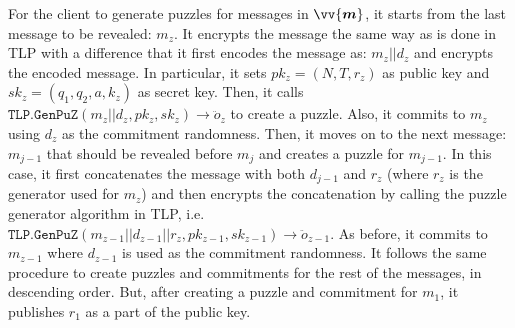 For the client to generate puzzles for messages in $\vv{\bm{m}}$, it starts from the last message to be revealed: $m_{\scriptscriptstyle z}$. It encrypts the message the same way as is done in  TLP with a difference that it first encodes the message as: $m_{\scriptscriptstyle z}||d_{\scriptscriptstyle z}$ and encrypts the encoded message. In particular, it sets $pk_{\scriptscriptstyle z}=(N,T,r_{\scriptscriptstyle z})$ as public key  and $sk_{\scriptscriptstyle z}=(q_{\scriptscriptstyle 1},q_{\scriptscriptstyle 2},a,k_{\scriptscriptstyle z})$ as secret key. Then, it calls   $\mathtt{TLP.GenPuZ}(m_{\scriptscriptstyle z}||d_{\scriptscriptstyle z},pk_{\scriptscriptstyle z},sk_{\scriptscriptstyle z})\rightarrow \ddot{o}_{\scriptscriptstyle z}$ to create a puzzle. Also, it commits to  $m_{\scriptscriptstyle z}$ using $d_{\scriptscriptstyle z}$ as the commitment randomness. Then, it moves on to the next message: $m_{\scriptscriptstyle j-1}$ that should be revealed before $m_{\scriptscriptstyle j}$ and creates a puzzle for $m_{\scriptscriptstyle j-1}$. In this case, it first concatenates the message with both $d_{\scriptscriptstyle j-1}$ and $r_{\scriptscriptstyle z}$ (where $r_{\scriptscriptstyle z}$ is the generator used for $m_{\scriptscriptstyle z}$) and then  encrypts the concatenation by calling the puzzle generator algorithm in   TLP, i.e.  $\mathtt{TLP.GenPuZ}(m_{\scriptscriptstyle z-1}||d_{\scriptscriptstyle z-1}||r_{\scriptscriptstyle z},pk_{\scriptscriptstyle z-1},sk_{\scriptscriptstyle z-1})\rightarrow \ddot{o}_{\scriptscriptstyle z-1}$.  As before, it commits to  $m_{\scriptscriptstyle z-1}$ where  $d_{\scriptscriptstyle z-1}$ is used as the commitment randomness.  It follows the same procedure to create puzzles and  commitments for the rest of the messages, in descending order. But,  after creating a puzzle and commitment for  $m_{\scriptscriptstyle 1}$, it publishes $r_{\scriptscriptstyle 1}$ as a part of  the public key. 

